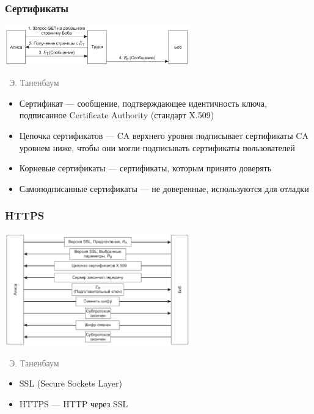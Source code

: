 \documentclass[xetex,mathserif,serif]{beamer}
\newcommand{\attribution}[1] {
\vspace{-5mm}\begin{flushright}\begin{scriptsize}\textcolor{gray}{\textcopyright\, #1}\end{scriptsize}\end{flushright}
}
\begin{document}
    \begin{frame}
        \frametitle{Сертификаты}
        \begin{center}
            \includegraphics[width=0.6\textwidth]{manInTheMiddle.png}
            \attribution{Э. Таненбаум}
        \end{center}
        \begin{itemize}
            \item Сертификат --- сообщение, подтверждающее идентичность ключа, подписанное Certificate Authority (стандарт X.509)
            \item Цепочка сертификатов --- CA верхнего уровня подписывает сертификаты CA уровнем ниже, чтобы они могли подписывать сертификаты пользователей
            \item Корневые сертификаты --- сертификаты, которым принято доверять
            \item Самоподписанные сертификаты --- не доверенные, используются для отладки
        \end{itemize}
    \end{frame}

    \begin{frame}
        \frametitle{HTTPS}
        \begin{center}
            \includegraphics[width=0.6\textwidth]{ssl.png}
            \attribution{Э. Таненбаум}
        \end{center}
        \begin{itemize}
            \item SSL (Secure Sockets Layer)
            \item HTTPS --- HTTP через SSL
        \end{itemize}
    \end{frame}
\end{document}
